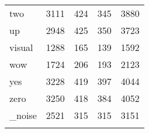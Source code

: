 \begin{table}[ht!]
\begin{center}
\begin{tabular}{ M{2cm}  M{1.75cm}  M{1.75cm}  M{1.75cm}  M{1.75cm} }
two & 3111 & 424 & 345 & 3880 \\
up & 2948 & 425 & 350 & 3723 \\
visual & 1288 & 165 & 139 & 1592 \\
wow & 1724 & 206 & 193 & 2123 \\
yes & 3228 & 419 & 397 & 4044 \\
zero & 3250 & 418 & 384 & 4052 \\
\_noise\footnotemark & 2521 & 315 & 315 & 3151 \\
\bottomrule
\label{tab:exp_dataset_all_labels}
\end{tabular}
\end{center}
\vspace{-4mm}
\end{table}
\FloatBarrier
\noindent
{}

